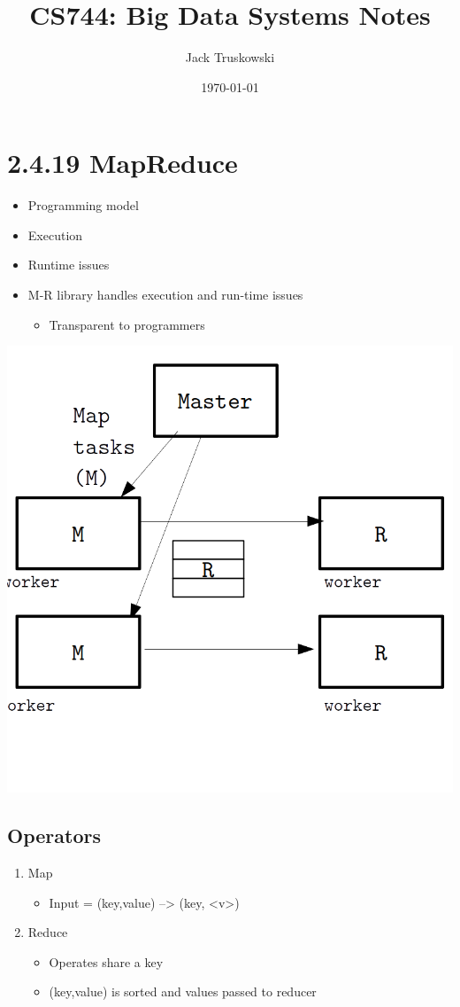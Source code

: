 \documentclass[11pt]{article}
\author{Jack Truskowski}
\date{\today}
\title{CS744: Big Data Systems Notes}
\begin{document}
\maketitle
\tableofcontents


\section{2.4.19 MapReduce}
\label{sec:orgheadline4}
\begin{itemize}
\item Programming model
\item Execution
\item Runtime issues
\item M-R library handles execution and run-time issues
\begin{itemize}
\item Transparent to programmers
\end{itemize}
\end{itemize}

\includegraphics[width=.9\linewidth]{diagrams/masterworker.png}

\subsection{Operators}
\label{sec:orgheadline1}
\begin{enumerate}
\item Map
\begin{itemize}
\item Input = (key,value) --> (key, <v>)
\end{itemize}
\item Reduce
\begin{itemize}
\item Operates share a key
\item (key,value) is sorted and values passed to reducer
\end{itemize}
\end{enumerate}
\end{document}
